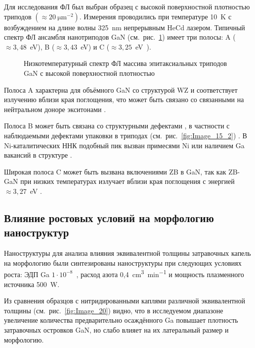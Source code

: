 Для исследования ФЛ был выбран образец с высокой поверхностной плотностью
триподов \((\approx 20~\si{\micro\meter^{-2}})\). Измерения проводились при
температуре 10~\si{\kelvin} с возбуждением на длине волны 325~\si{\nano\meter}
непрерывным HeCd лазером. Типичный спектр ФЛ ансамбля нанотриподов GaN
(см.~рис.~\cref{fig:Image_19}) имеет три полосы: A (\(\approx
3,48\)~\si{\electronvolt}), B (\(\approx 3,43\)~\si{\electronvolt}) и C
(\(\approx 3,25\)~\si{\electronvolt)}.

\begin{figure}[ht]   \caption{Низкотемпературный спектр ФЛ
		массива эпитаксиальных триподов GaN с высокой поверхностной
плотностью}\label{fig:Image_19} \end{figure}

Полоса A характерна для объёмного GaN со структурой WZ и соответствует
излучению вблизи края поглощения, что может быть связано со связанными на
нейтральном доноре экситонами \cite{Bolshakov2018, Richter2008, Agekyan2013}.

Полоса B может быть связана со структурными дефектами \cite{Calleja2000}, в
частности с наблюдаемыми дефектами упаковки в триподах
(см.~рис.~\cref{fig:Image_15_2}) \cite{Albrecht1997, Paskov2005}. В
Ni-каталитических ННК подобный пик вызван примесями Ni или наличием Ga вакансий
в структуре \cite{Yoo2006}.

Широкая полоса C может быть вызвана включениями ZB в GaN, так как ZB-GaN при
низких температурах излучает вблизи края поглощения с энергией \(\approx
3,27\)~\si{\electronvolt} \cite{Jacobs2007}.

\subsection{Влияние ростовых условий на морфологию наноструктур}\label{subsec:ch3/sec2/sub4}

Наноструктуры для анализа влияния эквивалентной толщины затравочных капель на
морфологию были синтезированы наноструктуры при следующих условиях роста: ЭДП
Ga \(1 \cdot 10^{-8}\)~\si{\torr}, расход азота
0,4~\si{\centi\meter^3\per\minute} и мощность плазменного источника
500~\si{\watt}.

Из сравнения образцов с нитридированными каплями различной эквивалентной
толщины (см.~рис.~\cref{fig:Image_20}) видно, что в исследуемом диапазоне
увеличение количества предварительно осаждённого Ga повышает плотность
затравочных островков GaN, но слабо влияет на их латеральный размер и
морфологию.

